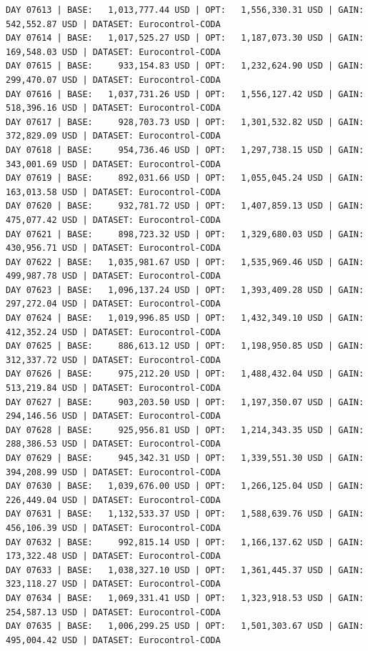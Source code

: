 \documentclass[11pt,a4paper]{article}
\begin{document}
\begin{verbatim}
DAY 07613 | BASE:   1,013,777.44 USD | OPT:   1,556,330.31 USD | GAIN: 542,552.87 USD | DATASET: Eurocontrol-CODA
DAY 07614 | BASE:   1,017,525.27 USD | OPT:   1,187,073.30 USD | GAIN: 169,548.03 USD | DATASET: Eurocontrol-CODA
DAY 07615 | BASE:     933,154.83 USD | OPT:   1,232,624.90 USD | GAIN: 299,470.07 USD | DATASET: Eurocontrol-CODA
DAY 07616 | BASE:   1,037,731.26 USD | OPT:   1,556,127.42 USD | GAIN: 518,396.16 USD | DATASET: Eurocontrol-CODA
DAY 07617 | BASE:     928,703.73 USD | OPT:   1,301,532.82 USD | GAIN: 372,829.09 USD | DATASET: Eurocontrol-CODA
DAY 07618 | BASE:     954,736.46 USD | OPT:   1,297,738.15 USD | GAIN: 343,001.69 USD | DATASET: Eurocontrol-CODA
DAY 07619 | BASE:     892,031.66 USD | OPT:   1,055,045.24 USD | GAIN: 163,013.58 USD | DATASET: Eurocontrol-CODA
DAY 07620 | BASE:     932,781.72 USD | OPT:   1,407,859.13 USD | GAIN: 475,077.42 USD | DATASET: Eurocontrol-CODA
DAY 07621 | BASE:     898,723.32 USD | OPT:   1,329,680.03 USD | GAIN: 430,956.71 USD | DATASET: Eurocontrol-CODA
DAY 07622 | BASE:   1,035,981.67 USD | OPT:   1,535,969.46 USD | GAIN: 499,987.78 USD | DATASET: Eurocontrol-CODA
DAY 07623 | BASE:   1,096,137.24 USD | OPT:   1,393,409.28 USD | GAIN: 297,272.04 USD | DATASET: Eurocontrol-CODA
DAY 07624 | BASE:   1,019,996.85 USD | OPT:   1,432,349.10 USD | GAIN: 412,352.24 USD | DATASET: Eurocontrol-CODA
DAY 07625 | BASE:     886,613.12 USD | OPT:   1,198,950.85 USD | GAIN: 312,337.72 USD | DATASET: Eurocontrol-CODA
DAY 07626 | BASE:     975,212.20 USD | OPT:   1,488,432.04 USD | GAIN: 513,219.84 USD | DATASET: Eurocontrol-CODA
DAY 07627 | BASE:     903,203.50 USD | OPT:   1,197,350.07 USD | GAIN: 294,146.56 USD | DATASET: Eurocontrol-CODA
DAY 07628 | BASE:     925,956.81 USD | OPT:   1,214,343.35 USD | GAIN: 288,386.53 USD | DATASET: Eurocontrol-CODA
DAY 07629 | BASE:     945,342.31 USD | OPT:   1,339,551.30 USD | GAIN: 394,208.99 USD | DATASET: Eurocontrol-CODA
DAY 07630 | BASE:   1,039,676.00 USD | OPT:   1,266,125.04 USD | GAIN: 226,449.04 USD | DATASET: Eurocontrol-CODA
DAY 07631 | BASE:   1,132,533.37 USD | OPT:   1,588,639.76 USD | GAIN: 456,106.39 USD | DATASET: Eurocontrol-CODA
DAY 07632 | BASE:     992,815.14 USD | OPT:   1,166,137.62 USD | GAIN: 173,322.48 USD | DATASET: Eurocontrol-CODA
DAY 07633 | BASE:   1,038,327.10 USD | OPT:   1,361,445.37 USD | GAIN: 323,118.27 USD | DATASET: Eurocontrol-CODA
DAY 07634 | BASE:   1,069,331.41 USD | OPT:   1,323,918.53 USD | GAIN: 254,587.13 USD | DATASET: Eurocontrol-CODA
DAY 07635 | BASE:   1,006,299.25 USD | OPT:   1,501,303.67 USD | GAIN: 495,004.42 USD | DATASET: Eurocontrol-CODA

\end{verbatim}
\end{document}
